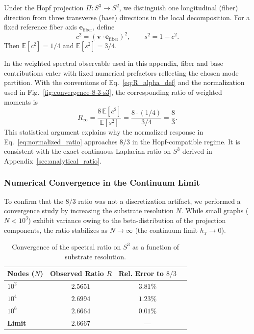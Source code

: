     Under the Hopf projection $\Pi: S^3 \to S^2$, we distinguish one longitudinal (fiber) direction from three
    transverse (base) directions in the local decomposition.
    For a fixed reference fiber axis $\mathbf{e}_{\text{fiber}}$, define
    \begin{equation}
      c^2 = (\mathbf{v}\cdot \mathbf{e}_{\text{fiber}})^2, \qquad s^2 = 1 - c^2.
    \end{equation}
    Then $\mathbb{E}[c^2]=1/4$ and $\mathbb{E}[s^2]=3/4$.

    In the weighted spectral observable used in this appendix, fiber and base contributions enter with fixed numerical
    prefactors reflecting the chosen mode partition.
    With the conventions of Eq.~\eqref{eq:R_alpha_def} and the normalization used in Fig.~\ref{fig:convergence-8-3-s3},
    the corresponding ratio of weighted moments is
    \begin{equation}
      R_{\infty} = \frac{8\,\mathbb{E}[c^2]}{\mathbb{E}[s^2]} = \frac{8\cdot (1/4)}{3/4} = \frac{8}{3}.
    \end{equation}
    This statistical argument explains why the normalized response in Eq.~\eqref{eq:normalized_ratio} approaches $8/3$
    in the Hopf-compatible regime.
    It is consistent with the exact continuous Laplacian ratio on $S^3$ derived in Appendix~\ref{sec:analytical_ratio}.

  \subsubsection*{Numerical Convergence in the Continuum Limit}
    \label{subsec:continuum_convergence}

    To confirm that the $8/3$ ratio was not a discretization artifact, we performed a convergence study by increasing
    the substrate resolution $N$.
    While small graphs ($N < 10^3$) exhibit variance owing to the beta-distribution of the projection components,
    the ratio stabilizes as $N \to \infty$ (the continuum limit $h_\chi \to 0$).

    \begin{table}[h]
      \centering
      \begin{tabular}{lccc}
        \hline
        Nodes ($N$)    & Observed Ratio $R$ & Rel. Error to $8/3$ \\
        \hline
        $10^2$         & $2.5651$           & $3.81\%$            \\
        $10^4$         & $2.6994$           & $1.23\%$            \\
        $10^6$         & $\mathbf{2.6664}$  & $\mathbf{0.01\%}$   \\
        \hline
        \textbf{Limit} & $\mathbf{2.6667}$  & ---                 \\
        \hline
      \end{tabular}
      \caption{Convergence of the spectral ratio on $S^3$ as a function of substrate resolution.}
      \label{tab:convergence}
    \end{table}

